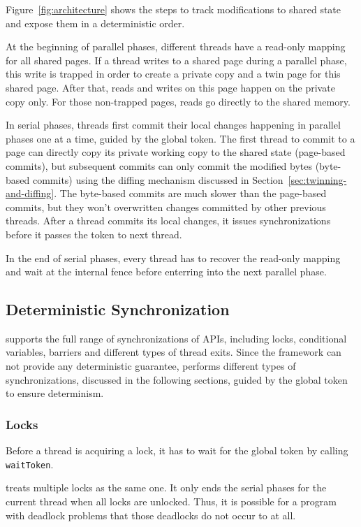 Figure~\ref{fig:architecture} shows the steps to track modifications to shared state and expose them in a deterministic order.  

At the beginning of parallel phases, different threads have a read-only mapping for all shared pages. If a thread writes to a shared page during a parallel phase, this write is trapped in order to create a private copy and a twin page for this shared page. After that, reads and writes on this page happen on the private copy only. For those non-trapped pages, reads go directly to the shared memory.  

In serial phases, threads first commit their local changes happening in parallel phases one at a time, guided by the global token.  The first thread to commit to a page can directly copy its private working copy to the shared state (page-based commits), but subsequent commits can only commit the modified bytes (byte-based commits) using the diffing mechanism discussed in Section~\ref{sec:twinning-and-diffing}. The byte-based commits are much slower than the page-based commits, but  they won't overwritten changes committed by other previous threads.  After a thread commits its local changes, it issues synchronizations before it passes the token to next thread. 

In the end of serial phases, every thread has to recover the read-only mapping and wait at the internal fence before enterring into the next parallel phase. 

\subsection{Deterministic Synchronization}
\label{sec:synchronization}

\dthreads{} supports the full range of synchronizations of \pthreads{} APIs, including locks, conditional variables, barriers and different types of thread exits. Since the\sheriff{} framework can not provide any deterministic guarantee, \dthreads{} performs different types of synchronizations, discussed in the following sections, guided by the global token to ensure determinism. 

\subsubsection{Locks}
Before a thread is acquiring a lock, it has to wait for the global token by calling \texttt{waitToken}. 

\dthreads{} treats multiple locks as the same one. It only ends the serial phases for the current thread when all locks are unlocked. Thus, it is possible for a program with deadlock problems that those deadlocks do not occur to \dthreads{} at all. 

